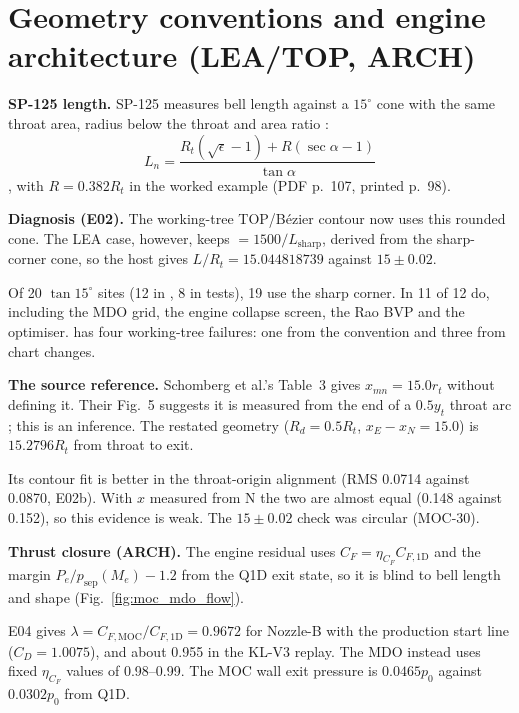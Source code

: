\section[Geometry and architecture]{Geometry conventions and engine architecture (LEA/TOP, ARCH)}
\label{sec:geometry-arch}

\textbf{SP-125 length.} SP-125 measures bell length against a $15^\circ$ cone with
the same throat area, radius below the throat and area ratio
\cite[PDF p.~100, printed p.~91]{huzel1967}:
\begin{equation}
L_n=\frac{R_t(\sqrt{\epsilon}-1)+R(\sec\alpha-1)}{\tan\alpha}
\end{equation}
\cite[PDF p.~99, printed p.~90, Eq.~4-7]{huzel1967}, with $R=0.382R_t$ in the worked
example (PDF p.~107, printed p.~98).

\textbf{Diagnosis (E02).} The working-tree TOP/B\'ezier contour now uses this rounded
cone. The LEA case, however, keeps  $=1500/L_{\mathrm{sharp}}$,
derived from the sharp-corner cone, so the host gives $L/R_t=15.044818739$ against
$15\pm0.02$.

Of 20 $\tan15^\circ$ sites (12 in , 8 in tests), 19 use the sharp corner.
In  11 of 12 do, including the MDO grid, the engine collapse screen, the
Rao BVP and the optimiser.  has four working-tree
failures: one from the convention and three from chart changes.

\textbf{The source reference.} Schomberg et al.'s Table~3 gives $x_{mn}=15.0r_t$ without
defining it. Their Fig.~5 suggests it is measured from the end of a $0.5y_t$ throat arc
\cite[PDF pp.~5--6 of the held EUCASS 2015 copy]{schomberg2019}; this is an inference.
The restated geometry ($R_d=0.5R_t$, $x_E-x_N=15.0$) is $15.2796R_t$ from throat to
exit.

Its contour fit is better in the throat-origin alignment (RMS 0.0714 against 0.0870,
E02b). With $x$ measured from N the two are almost equal (0.148 against 0.152), so this
evidence is weak. The $15\pm0.02$ check was circular (MOC-30).

\textbf{Thrust closure (ARCH).} The engine residual uses
$C_F=\eta_{C_F}C_{F,\mathrm{1D}}$ and the margin $P_e/p_{\mathrm{sep}}(M_e)-1.2$ from
the Q1D exit state, so it is blind to bell length and shape (Fig.~\ref{fig:moc_mdo_flow}).

E04 gives $\lambda=C_{F,\mathrm{MOC}}/C_{F,\mathrm{1D}}=0.9672$ for Nozzle-B with the
production start line ($C_D=1.0075$), and about 0.955 in the KL-V3 replay. The MDO
instead uses fixed $\eta_{C_F}$ values of 0.98--0.99. The MOC wall exit pressure is
$0.0465p_0$ against $0.0302p_0$ from Q1D.

